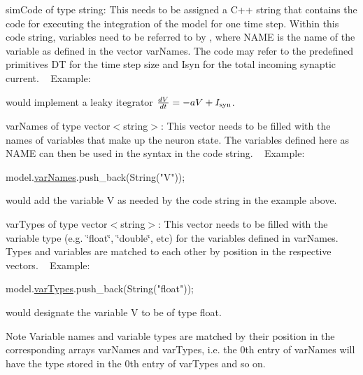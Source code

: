 \begin{DoxyItemize}
\item {\ttfamily sim\+Code} of type {\ttfamily string\+:} This needs to be assigned a C++ string that contains the code for executing the integration of the model for one time step. Within this code string, variables need to be referred to by , where N\+A\+M\+E is the name of the variable as defined in the vector var\+Names. The code may refer to the predefined primitives {\ttfamily D\+T} for the time step size and {\ttfamily Isyn} for the total incoming synaptic current. ~\newline
 Example\+: 
 would implement a leaky itegrator $\frac{dV}{dt}= -a V + I_{{\rm syn}}$.
\item {\ttfamily var\+Names} of type {\ttfamily vector$<$string$>$}\+: This vector needs to be filled with the names of variables that make up the neuron state. The variables defined here as {\ttfamily N\+A\+M\+E} can then be used in the syntax {\ttfamily } in the code string. ~\newline
 Example\+: 
\begin{DoxyCode}
model.\hyperlink{structneuronModel_a9a9156ffb643572fd67f6e585ef79ad0}{varNames}.push\_back(String(\textcolor{stringliteral}{"V"}));
\end{DoxyCode}
 would add the variable V as needed by the code string in the example above.
\item {\ttfamily var\+Types} of type {\ttfamily vector$<$string$>$}\+: This vector needs to be filled with the variable type (e.\+g. \char`\"{}float\char`\"{}, \char`\"{}double\char`\"{}, etc) for the variables defined in {\ttfamily var\+Names}. Types and variables are matched to each other by position in the respective vectors. ~\newline
 Example\+: 
\begin{DoxyCode}
model.\hyperlink{structneuronModel_a86788cb29131da0a26ce79693a076352}{varTypes}.push\_back(String(\textcolor{stringliteral}{"float"}));
\end{DoxyCode}
 would designate the variable V to be of type float. \begin{DoxyNote}{Note}
Variable names and variable types are matched by their position in the corresponding arrays {\ttfamily var\+Names} and {\ttfamily var\+Types}, i.\+e. the 0th entry of {\ttfamily var\+Names} will have the type stored in the 0th entry of {\ttfamily var\+Types} and so on.
\end{DoxyNote}


\end{DoxyItemize}
